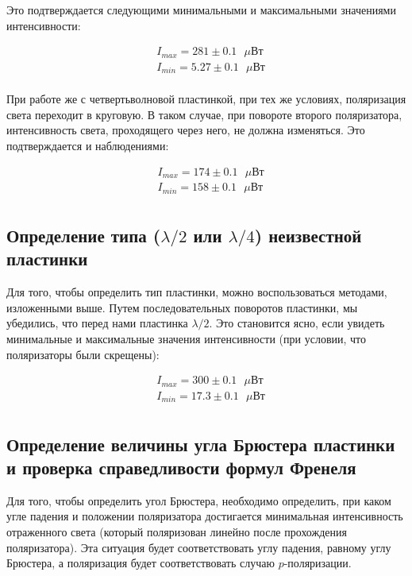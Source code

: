 \documentclass[a4paper, 12pt]{article}
\begin{document}
Это подтверждается следующими минимальными и максимальными значениями интенсивности:

\begin{align*}
	&I_{max} = 281 \pm 0.1 \text{ $\mu$Вт}\\
	&I_{min} = 5.27 \pm 0.1 \text{ $\mu$Вт}\\
\end{align*}

При работе же с четвертьволновой пластинкой, при тех же условиях, поляризация света переходит в круговую. В таком случае, при повороте второго поляризатора, интенсивность света, проходящего через него, не должна изменяться. Это подтверждается и наблюдениями:

\begin{align*}
	&I_{max} = 174 \pm 0.1 \text{ $\mu$Вт}\\
	&I_{min} = 158 \pm 0.1 \text{ $\mu$Вт}\\
\end{align*}

\subsection{Определение типа ($\lambda/2$ или $\lambda/4$) неизвестной пластинки}

Для того, чтобы определить тип пластинки, можно воспользоваться методами, изложенными выше. Путем последовательных поворотов пластинки, мы убедились, что перед нами пластинка $\lambda/2$. Это становится ясно, если увидеть минимальные и максимальные значения интенсивности (при условии, что поляризаторы были скрещены):

\begin{align*}
	&I_{max} = 300 \pm 0.1 \text{ $\mu$Вт}\\
	&I_{min} = 17.3 \pm 0.1 \text{ $\mu$Вт}\\
\end{align*}

\subsection{Определение величины угла Брюстера пластинки и проверка справедливости формул Френеля}

Для того, чтобы определить угол Брюстера, необходимо определить, при каком угле падения и положении поляризатора достигается минимальная интенсивность отраженного света (который поляризован линейно после прохождения поляризатора). Эта ситуация будет соответствовать углу падения, равному углу Брюстера, а поляризация будет соответствовать случаю $p$-поляризации.
\end{document}
